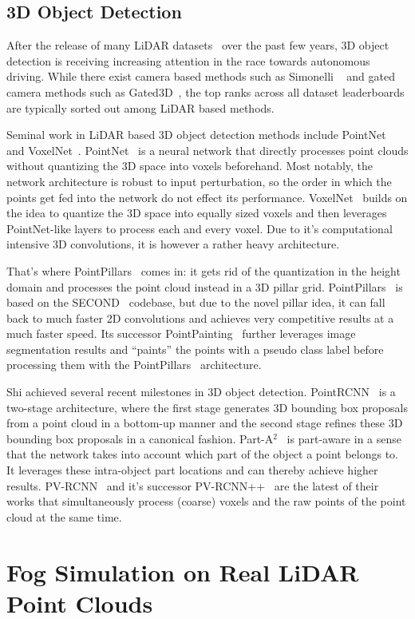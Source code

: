 \documentclass[10pt,twocolumn,letterpaper]{article}
\begin{document}
\subsection{3D Object Detection}
\label{sec:related_detection}

After the release of many LiDAR datasets~\cite{KITTI, nuscenes2019, lyft2019, Argoverse, WaymoOD, Honda3D, A2D2, Apollo, CADC, STF} over the past few years, 3D object detection is receiving increasing attention in the race towards autonomous driving. While there exist camera based methods such as Simonelli \etal ~\cite{Simonelli_2019_ICCV} and gated camera methods such as Gated3D~\cite{Gated3D}, the top ranks across all dataset leaderboards are typically sorted out among LiDAR based methods.

Seminal work in LiDAR based 3D object detection methods include PointNet~\cite{PointNet} and VoxelNet~\cite{VoxelNet}. PointNet~\cite{PointNet} is a neural network that directly processes point clouds without quantizing the 3D space into voxels beforehand. Most notably, the network architecture is robust to input perturbation, so the order in which the points get fed into the network do not effect its performance. VoxelNet~\cite{VoxelNet} builds on the idea to quantize the 3D space into equally sized voxels and then leverages PointNet-like layers to process each and every voxel. Due to it's computational intensive 3D convolutions, it is however a rather heavy architecture. 

That's where PointPillars~\cite{PP} comes in: it gets rid of the quantization in the height domain and processes the point cloud instead in a 3D pillar grid. PointPillars~\cite{PP} is based on the SECOND~\cite{SECOND} codebase, but due to the novel pillar idea, it can fall back to much faster 2D convolutions and achieves very competitive results at a much faster speed. Its successor PointPainting~\cite{PointPainting} further leverages image segmentation results and ``paints'' the points with a pseudo class label before processing them with the PointPillars~\cite{PP} architecture. 

Shi \etal achieved several recent milestones in 3D object detection. PointRCNN~\cite{PRCNN} is a two-stage architecture, where the first stage generates 3D bounding box proposals from a point cloud in a bottom-up manner and the second stage refines these 3D bounding box proposals in a canonical fashion. Part-A$^2$~\cite{PartA2} is part-aware in a sense that the network takes into account which part of the object a point belongs to. It leverages these intra-object part locations and can thereby achieve higher results. PV-RCNN~\cite{PV-RCNN} and it's successor PV-RCNN++~\cite{shi2021pvrcnn} are the latest of their works that simultaneously process (coarse) voxels and the raw points of the point cloud at the same time. \section{Fog Simulation on Real LiDAR Point Clouds}
\label{sec:derivation}
\end{document}
